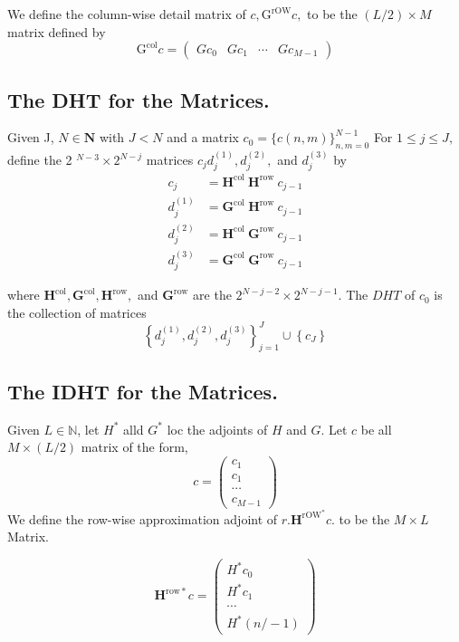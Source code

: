 We define the column-wise detail matrix of $c, \mathrm{G}^{\mathrm{rOW}} c,$ to be the $(L / 2) \times M$ matrix defined by
$$
\mathrm{G}^{\mathrm{col}} c=\left(\begin{array}{cccc}{G c_{0}} & {G c_{1}} & {\cdots} & {G c_{M-1}}\end{array}\right)
$$

\subsection{The DHT for the Matrices.}

Given J, $N \in \mathbf{N}$ with $J<N$ and a matrix $c_{0}=\{c(n, m)\}_{n, m=0}^{N-1}$
For $1 \leq j \leq J,$ define the 2 $^{N-3} \times 2^{N-j}$ matrices $c_{j} d_{j}^{(1)}, d_{j}^{(2)},$ and $d_{j}^{(3)}$ by
$$
\begin{aligned} c_{j} &=\mathbf{H}^{\text {col }} \mathbf{H}^{\text {row }} c_{j-1} \\ d_{j}^{(1)} &=\mathbf{G}^{\text {col }} \mathbf{H}^{\text {row }} c_{j-1} \\ d_{j}^{(2)} &=\mathbf{H}^{\text {col }} \mathbf{G}^{\text {row }} c_{j-1} \\ d_{j}^{(3)} &=\mathbf{G}^{\text {col }} \mathbf{G}^{\text {row }} c_{j-1} \end{aligned}
$$

where $\mathbf{H}^{\mathrm{col}}, \mathbf{G}^{\mathrm{col}}, \mathbf{H}^{\mathrm{row}},$ and $\mathbf{G}^{\mathrm{row}}$ are the $2^{N-j-2} \times 2^{N-j-1}$. The $D H T$ of $c_{0}$ is the collection of matrices
$$
\left\{d_{j}^{(1)}, d_{j}^{(2)}, d_{j}^{(3)}\right\}_{j=1}^{J} \cup\left\{c_{J}\right\}
$$


\subsection{The IDHT for the Matrices.}

Given $L \in \mathbb{N}$, let $H^{*}$ alld $G^{*}$ loc the adjoints of $H$ and $G$. Let $c$ be
all $M \times(L / 2)$ matrix of the form,
$$
c=\left(\begin{array}{c}{c_{1}} \\ {c_{1}} \\ {\cdots} \\ {c_{M-1}}\end{array}\right)
$$
We define the row-wise approximation adjoint of $r . \mathbf{H}^{\mathrm{rOW}^{*}} c$. to be the $M \times L$ Matrix.

$$
\mathbf{H}^{\mathrm{row} *} c=\left(\begin{array}{c}{H^{*} c_{0}} \\ {H^{*} c_{1}} \\ {\cdots} \\ {H^{*}(n /-1)}\end{array}\right)
$$

